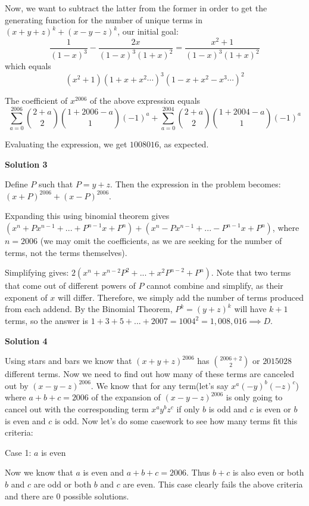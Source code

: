 \begin{enumerate}
 
Now, we want to subtract the latter from the former in order to get the generating function for the number of unique terms in $(x+y+z)^k + (x-y-z)^k$, our initial goal:
 \[\frac{1}{(1-x)^3}-\frac{2x}{(1-x)^3(1+x)^2} = \frac{x^2+1}{(1-x)^3(1+x)^2}\]which equals
 \[(x^2+1)(1+x+x^2\cdots)^3(1-x+x^2-x^3\cdots)^2\]

 
The coefficient of $x^{2006}$ of the above expression equals
 \[\sum_{a=0}^{2006}\binom{2+a}{2}\binom{1+2006-a}{1}(-1)^a + \sum_{a=0}^{2004}\binom{2+a}{2}\binom{1+2004-a}{1}(-1)^a\]

 
Evaluating the expression, we get $1008016$, as expected.

 



\textbf{Solution 3}

Define $P$ such that $P=y+z$. Then the expression in the problem becomes:$(x+P)^{2006}+(x-P)^{2006}$. 

 Expanding this using binomial theorem gives $(x^n+Px^{n-1}+...+P^{n-1}x+P^n)+(x^n-Px^{n-1}+...-P^{n-1}x+P^n)$, where $n=2006$ (we may omit the coefficients, as we are seeking for the number of terms, not the terms themselves). 

 Simplifying gives: $2(x^n+x^{n-2}P^2+...+x^2P^{n-2}+P^n)$. Note that two terms that come out of different powers of $P$ cannot combine and simplify, as their exponent of $x$ will differ. Therefore, we simply add the number of terms produced from each addend. By the Binomial Theorem, $P^k=(y+z)^k$ will have $k+1$ terms, so the answer is $1+3+5+...+2007=1004^2=1,008,016 \implies \boxed{D}$.

 



\textbf{Solution 4}

Using stars and bars we know that $(x+y+z)^{2006}$ has ${2006+2\choose 2}$ or $2015028$ different terms. Now we need to find out how many of these terms are canceled out by $(x-y-z)^{2006}$. We know that for any term(let's say $x^{a}(-y)^{b}(-z)^{c}$) where $a+b+c=2006$ of the expansion of  $(x-y-z)^{2006}$ is only going to cancel out with the corresponding term $x^{a}y^{b}z^{c}$ if only $b$ is odd and $c$ is even or $b$ is even and $c$ is odd. Now let's do some casework to see how many terms fit this criteria:

 Case 1:    $a$ is even  

 Now we know that $a$ is even and $a+b+c=2006$. Thus $b+c$ is also even or both $b$ and $c$ are odd or both $b$ and $c$ are even. This case clearly fails the above criteria and there are 0 possible solutions.


\end{enumerate}
